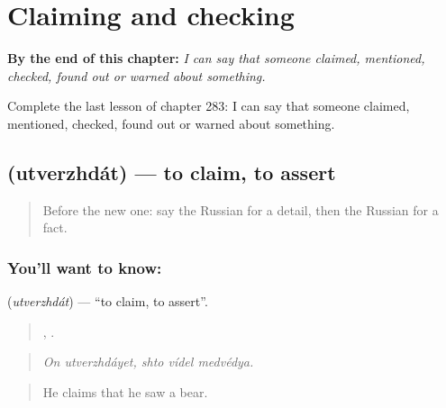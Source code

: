 
\chapter{Claiming and checking}
\label{ch:ru-claiming-and-checking}

\begin{chapteropening}
\textbf{By the end of this chapter:} \emph{I can say that someone claimed, mentioned, checked, found out or warned about something.}

Complete the last lesson of chapter 283: I can say that someone claimed, mentioned, checked, found out or warned about something.
\end{chapteropening}

\section[\texorpdfstring{\ru{утверждать} (utverzhdát)}{утверждать (utverzhdát)}]{ (utverzhdát) — to claim, to assert}

\label{lesson:RU-C283-utverzhdat}



\begin{quote}
Before the new one: say the Russian for a detail, then the Russian for a fact.
\end{quote}

\subsection*{You'll want to know: }
\textbf{} (\emph{utverzhdát}) — \textquotedblleft{}to claim, to assert\textquotedblright{}.

\begin{quote}
 ,   .
\end{quote}

\begin{quote}
\emph{On utverzhdáyet, shto vídel medvédya.}
\end{quote}

\begin{quote}
He claims that he saw a bear.
\end{quote}

